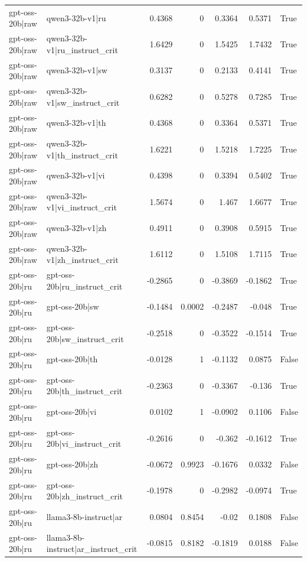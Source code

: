 \begin{table}
\begin{tabular}{l l r r r r l}
gpt-oss-20b|raw & qwen3-32b-v1|ru & 0.4368 & 0 & 0.3364 & 0.5371 & True \\
gpt-oss-20b|raw & qwen3-32b-v1|ru_instruct_crit & 1.6429 & 0 & 1.5425 & 1.7432 & True \\
gpt-oss-20b|raw & qwen3-32b-v1|sw & 0.3137 & 0 & 0.2133 & 0.4141 & True \\
gpt-oss-20b|raw & qwen3-32b-v1|sw_instruct_crit & 0.6282 & 0 & 0.5278 & 0.7285 & True \\
gpt-oss-20b|raw & qwen3-32b-v1|th & 0.4368 & 0 & 0.3364 & 0.5371 & True \\
gpt-oss-20b|raw & qwen3-32b-v1|th_instruct_crit & 1.6221 & 0 & 1.5218 & 1.7225 & True \\
gpt-oss-20b|raw & qwen3-32b-v1|vi & 0.4398 & 0 & 0.3394 & 0.5402 & True \\
gpt-oss-20b|raw & qwen3-32b-v1|vi_instruct_crit & 1.5674 & 0 & 1.467 & 1.6677 & True \\
gpt-oss-20b|raw & qwen3-32b-v1|zh & 0.4911 & 0 & 0.3908 & 0.5915 & True \\
gpt-oss-20b|raw & qwen3-32b-v1|zh_instruct_crit & 1.6112 & 0 & 1.5108 & 1.7115 & True \\
gpt-oss-20b|ru & gpt-oss-20b|ru_instruct_crit & -0.2865 & 0 & -0.3869 & -0.1862 & True \\
gpt-oss-20b|ru & gpt-oss-20b|sw & -0.1484 & 0.0002 & -0.2487 & -0.048 & True \\
gpt-oss-20b|ru & gpt-oss-20b|sw_instruct_crit & -0.2518 & 0 & -0.3522 & -0.1514 & True \\
gpt-oss-20b|ru & gpt-oss-20b|th & -0.0128 & 1 & -0.1132 & 0.0875 & False \\
gpt-oss-20b|ru & gpt-oss-20b|th_instruct_crit & -0.2363 & 0 & -0.3367 & -0.136 & True \\
gpt-oss-20b|ru & gpt-oss-20b|vi & 0.0102 & 1 & -0.0902 & 0.1106 & False \\
gpt-oss-20b|ru & gpt-oss-20b|vi_instruct_crit & -0.2616 & 0 & -0.362 & -0.1612 & True \\
gpt-oss-20b|ru & gpt-oss-20b|zh & -0.0672 & 0.9923 & -0.1676 & 0.0332 & False \\
gpt-oss-20b|ru & gpt-oss-20b|zh_instruct_crit & -0.1978 & 0 & -0.2982 & -0.0974 & True \\
gpt-oss-20b|ru & llama3-8b-instruct|ar & 0.0804 & 0.8454 & -0.02 & 0.1808 & False \\
gpt-oss-20b|ru & llama3-8b-instruct|ar_instruct_crit & -0.0815 & 0.8182 & -0.1819 & 0.0188 & False \\

\end{tabular}
\end{table}
